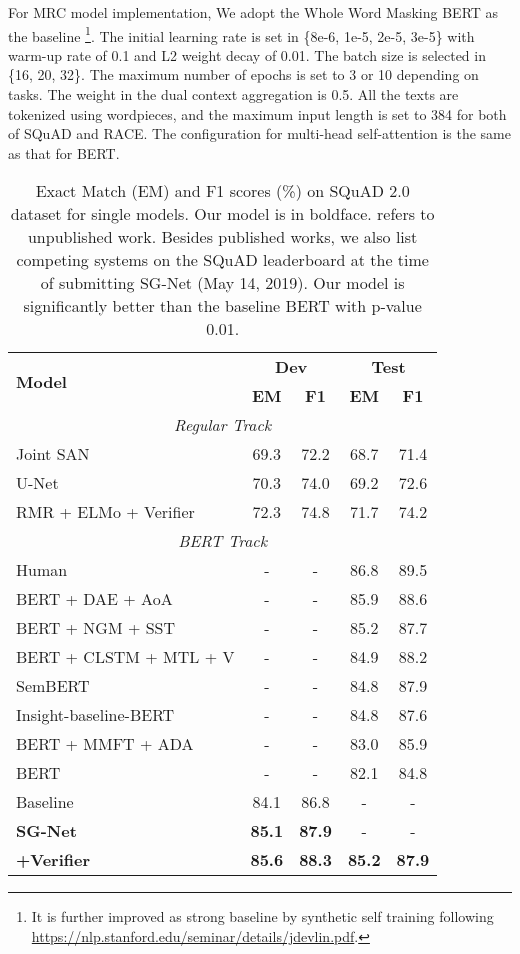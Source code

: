 \documentclass[letterpaper]{article} \usepackage{color}
\begin{document}
For MRC model implementation, We adopt the Whole Word Masking BERT as the baseline \footnote{It is further improved as strong baseline by synthetic self training following \url{https://nlp.stanford.edu/seminar/details/jdevlin.pdf}.}. The initial learning rate is set in \{8e-6, 1e-5, 2e-5, 3e-5\} with warm-up rate of 0.1 and L2 weight decay of 0.01. The batch size is selected in \{16, 20, 32\}. The maximum number of epochs is set to 3 or 10 depending on tasks. The weight  in the dual context aggregation is 0.5. All the texts are tokenized using wordpieces, and the maximum input length is set to 384 for both of SQuAD and RACE. The configuration for multi-head self-attention is the same as that for BERT. 

\begin{table}
	\centering
	\resizebox{\linewidth}{!}
	{
		\begin{tabular}{l c c c c }
			\hline
			\hline
			\multirow{2}{*}{\textbf{Model} }& \multicolumn{2}{c}{\textbf{Dev}} & \multicolumn{2}{c}{\textbf{Test}}\\
			& \textbf{EM} & \textbf{F1}&   \textbf{EM} & \textbf{F1}\\
			\hline
			\multicolumn{5}{c}{\emph{Regular Track}} \\
			Joint SAN &69.3 & 72.2 & 68.7 & 71.4\\	
			U-Net & 70.3  & 74.0  & 69.2 & 72.6 \\	
			RMR + ELMo + Verifier & 72.3  & 74.8 & 71.7 & 74.2 \\
			\hline
			\multicolumn{5}{c}{\emph{BERT Track}} \\
			Human& -  & - & 86.8&	89.5 \\
			\hdashline
			BERT + DAE + AoA& -  & -   & 85.9 & 88.6 \\
			BERT + NGM + SST& -  & - & 85.2 & 87.7\\
			BERT + CLSTM + MTL + V& -  & -   & 84.9 &	88.2 \\
			SemBERT& -  & -  & 84.8 &	87.9   \\
			Insight-baseline-BERT& -  & - & 84.8 &	87.6 \\
			BERT + MMFT + ADA& -  & -  & 83.0 & 85.9 \\
			BERT & -  & - &  82.1 &  84.8 \\
			\hline
			Baseline & 84.1  & 86.8 & -  & - \\
			\textbf{SG-Net}  & \textbf{85.1} & \textbf{87.9} & - & -\\
			\textbf{+Verifier} &  \textbf{85.6} & \textbf{88.3}  & \textbf{85.2} & \textbf{87.9}  \\

			\hline
			\hline
		\end{tabular}
	}
	\caption{\label{tab:squad2.0} Exact Match (EM) and F1 scores (\%) on SQuAD 2.0 dataset for single models. Our model is in boldface.  refers to unpublished work. Besides published works, we also list competing systems on the SQuAD leaderboard at the time of submitting SG-Net (May 14, 2019). Our model is significantly better than the baseline BERT with p-value  0.01.}
\end{table}
\end{document}
